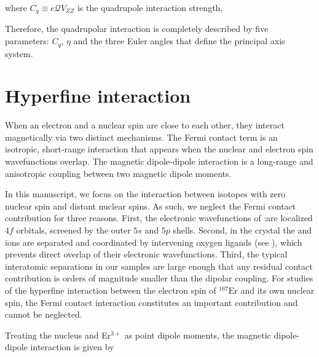 where $C_q \equiv e\mathcal{Q}V_{ZZ}$ is the quadrupole interaction strength,

Therefore, the quadrupolar interaction is completely described by five parameters: $C_q$, $\eta$ and the three Euler angles that define the principal axis system.


\section{Hyperfine interaction}

When an electron and a nuclear spin are close to each other, they interact magnetically via two distinct mechanisms. The Fermi contact term is an isotropic, short-range interaction that appears when the nuclear and electron spin wavefunctions overlap. The magnetic dipole-dipole interaction is a long-range and anisotropic coupling between two magnetic dipole moments.

In this manuscript, we focus on the interaction between \Er isotopes with zero nuclear spin and distant nuclear spins. As such, we neglect the Fermi contact contribution for three reasons. First, the electronic wavefunctions of \Er:\Ca are localized $4f$ orbitals, screened by the outer $5s$ and $5p$ shells. Second, in the crystal the \Er and \W ions are separated and coordinated by intervening oxygen ligands (see ), which prevents direct overlap of their electronic wavefunctions. Third, the typical interatomic separations in our samples are large enough that any residual contact contribution is orders of magnitude smaller than the dipolar coupling. For studies of the hyperfine interaction between the electron spin of $^{167}\mathrm{Er}$ and its own nuclear spin, the Fermi contact interaction constitutes an important contribution and cannot be neglected.

Treating the nucleus and Er$^{3+}$ as point dipole moments, the magnetic dipole-dipole interaction is given by 

